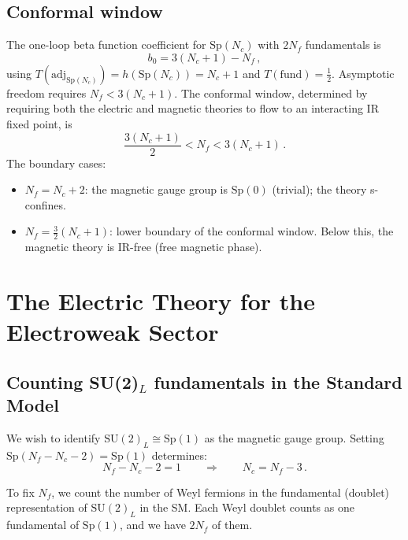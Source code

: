 \documentclass[11pt,a4paper]{article}
\theoremstyle{plain}
\theoremstyle{definition}
\theoremstyle{remark}
\newcommand{\Nc}{N_{\!c}}
\newcommand{\Nf}{N_{\!f}}
\newcommand{\SU}[1]{\mathrm{SU}(#1)}
\newcommand{\Sp}[1]{\mathrm{Sp}(#1)}
\newcommand{\adj}{\mathrm{adj}}
\begin{document}
\subsection{Conformal window}

The one-loop beta function coefficient for $\Sp{\Nc}$ with $2\Nf$
fundamentals is
\begin{equation}\label{eq:Sp-b0}
  b_0 = 3(\Nc + 1) - \Nf\,,
\end{equation}
using $T(\adj_{\Sp{\Nc}}) = h(\Sp{\Nc}) = \Nc + 1$ and
$T(\mathrm{fund}) = \tfrac{1}{2}$.  Asymptotic freedom requires
$\Nf < 3(\Nc + 1)$.  The conformal window, determined by requiring
both the electric and magnetic theories to flow to an interacting
IR fixed point, is
\begin{equation}\label{eq:Sp-CW}
  \frac{3(\Nc + 1)}{2} < \Nf < 3(\Nc + 1)\,.
\end{equation}
The boundary cases:
\begin{itemize}
  \item $\Nf = \Nc + 2$: the magnetic gauge group is $\Sp{0}$
    (trivial); the theory s-confines.
  \item $\Nf = \tfrac{3}{2}(\Nc + 1)$: lower boundary of the
    conformal window.  Below this, the magnetic theory is IR-free
    (free magnetic phase).
\end{itemize}


\section{The Electric Theory for the Electroweak Sector}
\label{sec:electric-theory}

\subsection{Counting SU(2)$_L$ fundamentals in the Standard Model}

We wish to identify $\SU{2}_L \cong \Sp{1}$ as the magnetic gauge
group.  Setting $\Sp{\Nf - \Nc - 2} = \Sp{1}$ determines:
\begin{equation}\label{eq:Nc-constraint}
  \Nf - \Nc - 2 = 1
  \qquad\Longrightarrow\qquad
  \Nc = \Nf - 3\,.
\end{equation}

To fix $\Nf$, we count the number of Weyl fermions in the
fundamental (doublet) representation of $\SU{2}_L$ in the SM.  Each
Weyl doublet counts as one fundamental of $\Sp{1}$, and we have
$2\Nf$ of them.
\end{document}
